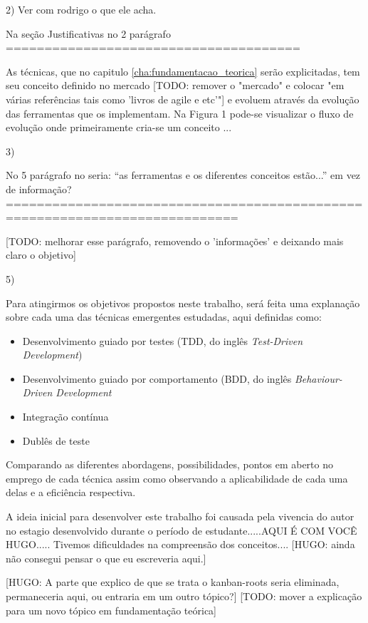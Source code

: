 2) Ver com rodrigo o que ele acha.

  Na seção Justificativas no 2 parágrafo
  ======================================

  As técnicas, que no capitulo \ref{cha:fundamentacao_teorica} serão explicitadas, tem seu conceito definido no mercado [TODO: remover o "mercado" e colocar "em várias referências tais como 'livros de agile e etc'"] e evoluem através da evolução das ferramentas que os implementam. Na Figura 1 pode-se visualizar o fluxo de evolução onde primeiramente cria-se um conceito ...


3)

  No 5 parágrafo no seria: “as ferramentas e os diferentes conceitos estão...” em vez de informação?
  ============================================================================

  [TODO: melhorar esse parágrafo, removendo o 'informações' e deixando mais claro o objetivo]


5)

  Para atingirmos os objetivos propostos neste trabalho, será feita uma explanação sobre cada uma das técnicas emergentes estudadas, aqui definidas como:

  \begin{itemize}
    \item Desenvolvimento guiado por testes (TDD, do inglês \textit{Test-Driven Development})
    \item Desenvolvimento guiado por comportamento (BDD, do inglês \textit{Behaviour-Driven Development}
    \item Integração contínua
    \item Dublês de teste
  \end{itemize}

  Comparando as diferentes abordagens, possibilidades, pontos em aberto no emprego de cada técnica assim como observando a aplicabilidade de cada uma delas e a eficiência respectiva.

  A ideia inicial para desenvolver este trabalho foi causada pela vivencia do autor no estagio desenvolvido durante o período de estudante.....AQUI É COM VOCÊ HUGO..... Tivemos dificuldades na compreensão dos conceitos.... [HUGO: ainda não consegui pensar o que eu escreveria aqui.]

  [HUGO: A parte que explico de que se trata o kanban-roots seria eliminada, permaneceria aqui, ou entraria em um outro tópico?]
  [TODO: mover a explicação para um novo tópico em fundamentação teórica]


